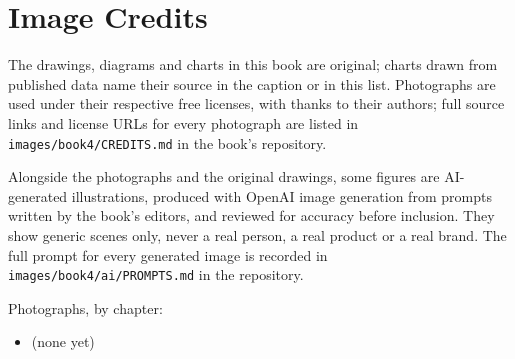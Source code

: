 \chapter*{Image Credits}

The drawings, diagrams and charts in this book are original; charts drawn
from published data name their source in the caption or in this list.
Photographs are used under their respective free licenses, with thanks to
their authors; full source links and license URLs for every photograph are
listed in \texttt{images/book4/CREDITS.md} in the book's repository.

\bigskip
Alongside the photographs and the original drawings, some figures are
AI-generated illustrations, produced with OpenAI image generation from
prompts written by the book's editors, and reviewed for accuracy before
inclusion. They show generic scenes only, never a real person, a real
product or a real brand. The full prompt for every generated image is
recorded in \texttt{images/book4/ai/PROMPTS.md} in the repository.

\bigskip
\noindent Photographs, by chapter:
\begin{itemize}\small
  \item (none yet)
\end{itemize}
